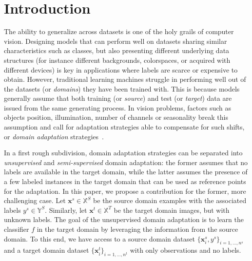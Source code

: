 \documentclass[runningheads]{llncs}
\begin{document}
\section{Introduction}
\label{sec:Int}
The ability to generalize across datasets is one of the holy grails of computer vision. Designing models that can perform well on datasets sharing similar characteristics such as classes, but also presenting different underlying data structures (for instance different backgrounds, colorspaces, or acquired with different devices) is key in applications where labels are scarce or expensive to obtain. However, traditional learning machines struggle in performing well out of the datasets (or \emph{domains}) they have been trained with. This is because models generally assume that both training (or \emph{source}) and test (or \emph{target}) data are issued from the same generating process. In vision problems, factors such as objects position, illumination, number of channels or seasonality break this assumption and call for adaptation strategies able to compensate for such shifts, or \emph{domain adaptation} strategies~\cite{Pat15}.

In a first rough subdivision, domain adaptation strategies can be separated into \emph{unsupervised} and \emph{semi-supervised} domain adaptation: the former assumes that no labels are available in the target domain, while the latter assumes the presence of a few labeled instances in the target domain that can be used as reference points for the adaptation. In this paper, we propose a contribution for the former, more challenging case. 
Let $\mathbf{x}^s \in \mathbb{X}^S$ be the source domain examples with the associated labels $y^s \in \mathbb{Y}^S$. Similarly, let $\mathbf{x}^t \in \mathbb{X}^T$ be the target domain images, but with unknown labels. The goal of the unsupervised domain adaptation is to learn the classifier $f$ in the target domain by leveraging the information from the source domain. To this end, we have access to a source domain dataset $\{\mathbf{x}^s_i,y^s \}_{i=1,\dots,n^s}$ and a target domain dataset $\{\mathbf{x}^t_i \}_{i=1,\dots,n^t}$ with only observations and no labels.
\end{document}
